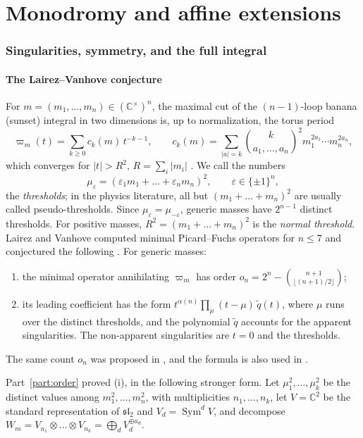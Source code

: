 \documentclass[11pt,a4paper]{article}
\theoremstyle{definition}
\theoremstyle{remark}
\numberwithin{equation}{section}
\newcommand{\C}{\mathbb{C}}
\newcommand{\sltwo}{\mathfrak{sl}_2}
\DeclareMathOperator{\Sym}{Sym}
\begin{document}
\clearpage
\part{Monodromy and affine extensions}\label{part:structure}


\section{Singularities, symmetry, and the full integral}

\subsection{The Lairez--Vanhove conjecture}
For $m=(m_1,\dots,m_n)\in(\C^\times)^n$, the maximal cut of the $(n-1)$-loop banana (sunset) integral in two dimensions is, up to normalization, the torus period
\begin{equation}\label{bs:eq:varpi}
\varpi_m(t)=\sum_{k\ge0}c_k(m)\,t^{-k-1},\qquad c_k(m)=\sum_{|a|=k}\binom{k}{a_1,\dots,a_n}^{2}m_1^{2a_1}\cdots m_n^{2a_n},
\end{equation}
which converges for $|t|>R^2$, $R=\sum_i|m_i|$ \cite{LV23,BFKNS21}. We call the numbers
\[
\mu_\varepsilon=(\varepsilon_1m_1+\dots+\varepsilon_nm_n)^2,\qquad\varepsilon\in\{\pm1\}^n ,
\]
the \emph{thresholds}; in the physics literature, all but $(m_1+\dots+m_n)^2$ are usually called pseudo-thresholds. Since $\mu_\varepsilon=\mu_{-\varepsilon}$, generic masses have $2^{n-1}$ distinct thresholds. For positive masses, $R^2=(m_1+\dots+m_n)^2$ is the \emph{normal threshold}. Lairez and Vanhove computed minimal Picard--Fuchs operators for $n\le7$ and conjectured the following \cite[Conj.~4.0.1]{LV23}. For generic masses:
\begin{enumerate}
\item[(i)] the minimal operator annihilating $\varpi_m$ has order $o_n=2^n-\binom{n+1}{\lfloor(n+1)/2\rfloor}$;
\item[(ii)] its leading coefficient has the form $t^{\alpha(n)}\prod_{\mu}(t-\mu)\,\tilde q(t)$, where $\mu$ runs over the distinct thresholds, and the polynomial $\tilde q$ accounts for the apparent singularities. The non-apparent singularities are $t=0$ and the thresholds.
\end{enumerate}
The same count $o_n$ was proposed in \cite{BFKNS21}, and the formula is also used in \cite[\S3.1]{Van26}.

Part~\ref{part:order}  proved (i), in the following stronger form. Let $\mu_1^2,\dots,\mu_k^2$ be the distinct values among $m_1^2,\dots,m_n^2$, with multiplicities $n_1,\dots,n_k$, let $V=\C^2$ be the standard representation of $\sltwo$ and $V_d=\Sym^dV$, and decompose $W_m=V_{n_1}\otimes\dots\otimes V_{n_k}=\bigoplus_dV_d^{\oplus a_d}$.
\end{document}
